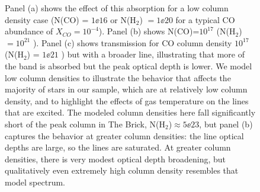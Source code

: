 \documentclass[times,astrosymb,twocolumn]{aastex631}
\def\rr#1{#1}
\begin{document}
\begin{figure}
{    \rr{Panel (a)} shows the effect of this absorption for a low column density case (N(CO) = $1\ee{16}$ \persc or N(H$_2$) $=1\ee{20}$ \persc for a typical CO abundance of $X_{CO} = 10^{-4}$).
    \rr{Panel (b)} shows N(CO)=$10^{17}$ \persc (N(H$_2$) $=10^{21}$ \persc).
    \rr{Panel (c)} shows transmission for CO column density $10^{17}$ \persc (N(H$_2$) = $1\ee{21}$ \persc) but with a broader line, illustrating that more of the band is absorbed but the peak optical depth is lower.
    \rr{We model low column densities to illustrate the behavior that affects the majority of stars in our sample, which are at relatively low column density, and to highlight the effects of gas temperature on the lines that are excited.}
    \rr{The modeled column densities here fall significantly short of the peak column in The Brick, N(H$_2$)$\approx5\ee{23}$, but panel (b) captures the behavior at greater column densities: the line optical depths are large, so the lines are saturated.
    At greater column densities, there is very modest optical depth broadening, but qualitatively even extremely high column density resembles that model spectrum.}
    }
    \label{fig:COexamplespectra}
\end{figure}
\end{document}
